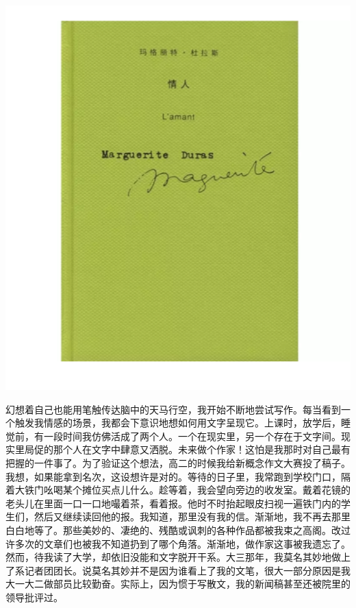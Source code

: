 \documentclass[
]{book}
\begin{document}
\includegraphics[width=7.49in]{images/dream1}

幻想着自己也能用笔触传达脑中的天马行空，我开始不断地尝试写作。每当看到一个触发我情感的场景，我都会下意识地想如何用文字呈现它。上课时，放学后，睡觉前，有一段时间我仿佛活成了两个人。一个在现实里，另一个存在于文字间。现实里局促的那个人在文字中肆意又洒脱。未来做个作家！这怕是我那时对自己最有把握的一件事了。为了验证这个想法，高二的时候我给新概念作文大赛投了稿子。我想，如果能拿到名次，这设想许是对的。等待的日子里，我常跑到学校门口，隔着大铁门吆喝某个摊位买点儿什么。趁等着，我会望向旁边的收发室。戴着花镜的老头儿在里面一口一口地嘬着茶，看着报。他时不时抬起眼皮扫视一遍铁门内的学生们，然后又继续读回他的报。我知道，那里没有我的信。渐渐地，我不再去那里白白地等了。那些美妙的、凄绝的、残酷或讽刺的各种作品都被我束之高阁。改过许多次的文章们也被我不知道扔到了哪个角落。渐渐地，做作家这事被我遗忘了。然而，待我读了大学，却依旧没能和文字脱开干系。大三那年，我莫名其妙地做上了系记者团团长。说莫名其妙并不是因为谁看上了我的文笔，很大一部分原因是我大一大二做部员比较勤奋。实际上，因为惯于写散文，我的新闻稿甚至还被院里的领导批评过。
\end{document}
